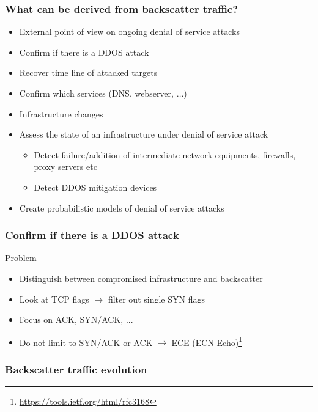 \documentclass{beamer}
\begin{document}
\begin{frame}
\frametitle{What can be derived from backscatter traffic?}

\begin{itemize}
    \item External point of view on ongoing denial of service attacks
    \item Confirm if there is a DDOS attack
    \item Recover time line of attacked targets
    \item Confirm which services (DNS, webserver, $\dots$)
    \item Infrastructure changes
    \item Assess the state of an infrastructure under denial of service attack
    \begin{itemize}
        \item Detect failure/addition of  intermediate network equipments, firewalls, proxy servers etc
        \item Detect DDOS mitigation devices
    \end{itemize}
    \item Create probabilistic models of denial of service attacks
\end{itemize}
\end{frame}

\begin{frame}
    \frametitle{Confirm if there is a DDOS attack}
    \begin{block}{Problem}
        \begin{itemize}
            \item Distinguish between compromised infrastructure and backscatter
            \item Look at TCP flags $\to$ filter out single SYN flags
            \item Focus on ACK, SYN/ACK, ...
            \item Do not limit to SYN/ACK or ACK $\to$ ECE (ECN Echo)\footnote{\url{https://tools.ietf.org/html/rfc3168}}
        \end{itemize}
    \end{block}
    
\end{frame}

\begin{frame}
    \frametitle{Backscatter traffic evolution}
    \begin{center}
        \scalebox{0.9}{}
    \end{center}
\end{frame}
\end{document}
